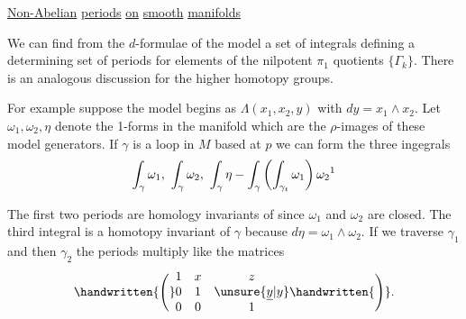 \uline{Non-Abelian} \uline{periods} \uline{on} \uline{smooth} \uline{manifolds}

We can find from the \(d\)-formulae of the model a set of integrals defining a determining set of periods for elements of the nilpotent \(\pi_1\) quotients \(\{\Gamma_k\}\). There is an analogous discussion for the higher homotopy groups.

For example suppose the model begins as \(\Lambda(x_1,x_2,y)\) with \(dy=x_1\wedge x_2\). Let \(\omega_1,\omega_2,\eta\) denote the 1-forms in the manifold which are the \(\rho\)-images of these model generators. If \(\gamma\) is a loop in \(M\) based at \(p\) we can form the three ingegrals
\[
 \int_\gamma\omega_1,\ \int_\gamma\omega_2,\ \int_\gamma\eta
 -\int_\gamma\left(\int_{\gamma_t}\omega_1\right)\omega_2\text{\footnotemark[1]}
\]

The first two periods are homology invariants of since \(\omega_1\) and \(\omega_2\) are closed. The third integral is a homotopy invariant of \(\gamma\) because \(d\eta=\omega_1\wedge\omega_2\). If we traverse \(\gamma_1\) and then \(\gamma_2\) the periods multiply like the matrices
\[
 \mathopen{\handwritten{\Bigg(}}\begin{matrix}1&x&z\\0&1&\unsure{\underline y|y}\\0&0&1\end{matrix}
 \mathclose{\handwritten{\Bigg)}}.
\]

